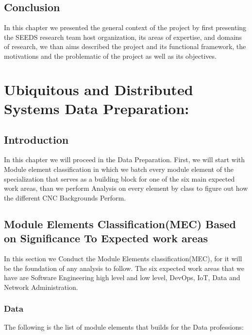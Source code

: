 \documentclass[12pt]{extreport}
\begin{document}
\section{Conclusion}
In this chapter we presented the general context of the project by first presenting the  SEEDS research team host organization, its areas of expertise, and domains of research, we than aims described the project and its functional framework, the motivations and the problematic of the project as well as its objectives.


\chapter{Ubiquitous and Distributed Systems Data Preparation:}

\section{Introduction}
In this chapter we will proceed in the  Data Preparation. First, we will start with Module element classification in which we batch every module element of the specialization that serves as a building block  for one of the six main expected work areas, than we perform Analysis on every element by class to figure out how the different CNC Backgrounds Perform.   

\section{Module Elements Classification(MEC) Based on Significance To Expected work areas}


In this section we Conduct the Module Elements classification(MEC), for it will be the foundation of any analysis to follow. The six expected work areas that we have are Software Engineering high level and low level, DevOps, IoT, Data and Network Administration.


\subsection{Data}
The following is the list of module elements that builds for the Data professions:
\end{document}
